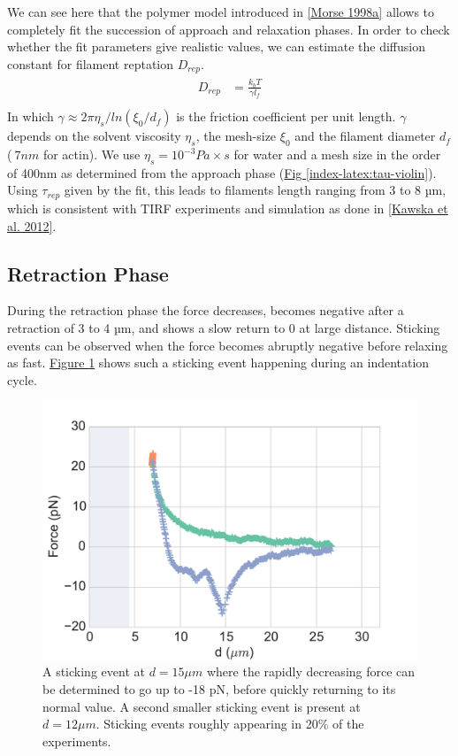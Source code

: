 \documentclass[A4paperpaper,11pt,english]{sphinxmanual}
\begin{document}
We can see here that the polymer model introduced in {\hyperref[index-latex:morse1998a]{{[}Morse  1998a{]}}} allows
to completely fit the succession of approach and relaxation phases.  In order to check whether
the fit parameters give realistic values, we can estimate the diffusion constant
for filament reptation \(D_{rep}\).
\label{index-latex:equation-eqa3-10}\begin{gather}
\begin{split}D_{rep} &= \frac{k_bT}{\gamma l_f} \\\end{split}\label{index-latex-eqa3-10}
\end{gather}
In which \(\gamma\approx {2\pi\eta_s}/{ln(\xi_0/d_f)}\) is the friction
coefficient per unit length. \(\gamma\) depends on the solvent viscosity
\(\eta_s\), the mesh-size \(\xi_0\) and the filament diameter
\(d_f\) (\(~7nm\) for actin).  We use \(\eta_s=10^{-3} Pa\times s\)
for water and a mesh size in the order of 400nm as determined from the approach phase
(\hyperref[index-latex:tau-violin]{Fig  \ref*{index-latex:tau-violin}}). Using \(\tau_{rep}\) given by the fit, this leads to filaments
length ranging from 3 to 8 µm, which is consistent with TIRF experiments and simulation as done in {\hyperref[index-latex:kawska2012]{{[}Kawska et al. 2012{]}}}.


\subsection{Retraction Phase}
\label{index-latex:retraction-phase}
During the retraction phase the force decreases, becomes negative after a
retraction of 3 to 4 µm, and shows a slow  return to 0 at large distance.
Sticking events can be observed when the force becomes abruptly negative before
relaxing as fast. \hyperref[index-latex:sticking-event]{Figure  \ref*{index-latex:sticking-event}} shows such a sticking event
happening during an indentation cycle.
\begin{figure}[htbp]
\centering
\capstart

\includegraphics[width=0.800\linewidth]{sticking-event.pdf}
\caption{A sticking event at \(d=15\mu{}m\) where the rapidly decreasing force can be determined to go
up to -18 pN, before quickly returning to its normal value. A second smaller
sticking event is present at \(d=12\mu{}m\). Sticking events roughly appearing in 20\% of
the experiments.}\label{index-latex:sticking-event}\end{figure}
\end{document}
